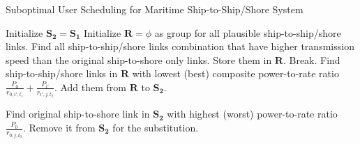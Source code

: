 \documentclass[conference]{IEEEtran}
\begin{document}
 
 
 
 
 \begin{algorithm}[ht]
 \caption{Suboptimal User Scheduling for Maritime Ship-to-Ship/Shore System}
 \begin{algorithmic}[1]
 \STATE Initialize ${{\mathbf{S}}_{\mathbf{2}}}={{\mathbf{S}}_{\mathbf{1}}}$
 \STATE Initialize ${\mathbf{R}} = \phi $ as group for all plausible ship-to-ship/shore links.
 \STATE Find all ship-to-ship/shore links combination that have higher transmission speed than the original ship-to-shore only links. Store them in ${\mathbf{R}}$.
    \STATE Break.
   \ENDIF
   \STATE Find ship-to-ship/shore links in ${\mathbf{R}}$ with lowest (best) composite power-to-rate ratio $ {\frac{{{P_0}}}{{{r_{0,i',{t_1}}}}} + \frac{{{P_{i'}}}}{{{r_{i',j,{t_2}}}}}} $. 
    \STATE Add them from ${\mathbf{R}}$ to ${{\mathbf{S}}_{\mathbf{2}}}$.
   \ENDIF
   \ENDWHILE
 \ENDFOR

   \STATE Find original ship-to-shore link in ${{\mathbf{S}}_{\mathbf{2}}}$ with highest (worst) power-to-rate ratio ${\frac{P_0}{r_{0,j,{t_0}}}}$. 
   \STATE Remove it from ${{\mathbf{S}}_{\mathbf{2}}}$ for the substitution.
   
 \ENDWHILE
 \end{algorithmic}
 \end{algorithm}
 
\end{document}
